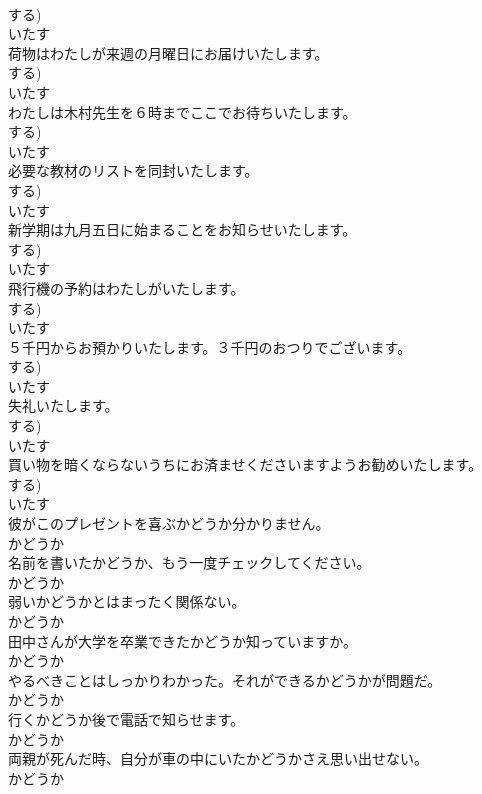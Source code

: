 \documentclass[8pt]{extreport}
\begin{document}
\begin{CJK}{UTF8}{min}
\\	する)	
\\	いたす
\\	荷物はわたしが来週の月曜日にお届けいたします。	
\\	する)	
\\	いたす
\\	わたしは木村先生を６時までここでお待ちいたします。	
\\	する)	
\\	いたす
\\	必要な教材のリストを同封いたします。	
\\	する)	
\\	いたす
\\	新学期は九月五日に始まることをお知らせいたします。	
\\	する)	
\\	いたす
\\	飛行機の予約はわたしがいたします。	
\\	する)	
\\	いたす
\\	５千円からお預かりいたします。３千円のおつりでございます。	
\\	する)	
\\	いたす
\\	失礼いたします。	
\\	する)	
\\	いたす
\\	買い物を暗くならないうちにお済ませくださいますようお勧めいたします。	
\\	する)	
\\	いたす
\\	彼がこのプレゼントを喜ぶかどうか分かりません。	
\\	かどうか
\\	名前を書いたかどうか、もう一度チェックしてください。	
\\	かどうか
\\	弱いかどうかとはまったく関係ない。	
\\	かどうか
\\	田中さんが大学を卒業できたかどうか知っていますか。	
\\	かどうか
\\	やるべきことはしっかりわかった。それができるかどうかが問題だ。	
\\	かどうか
\\	行くかどうか後で電話で知らせます。	
\\	かどうか
\\	両親が死んだ時、自分が車の中にいたかどうかさえ思い出せない。	
\\	かどうか

\end{CJK}
\end{document}
